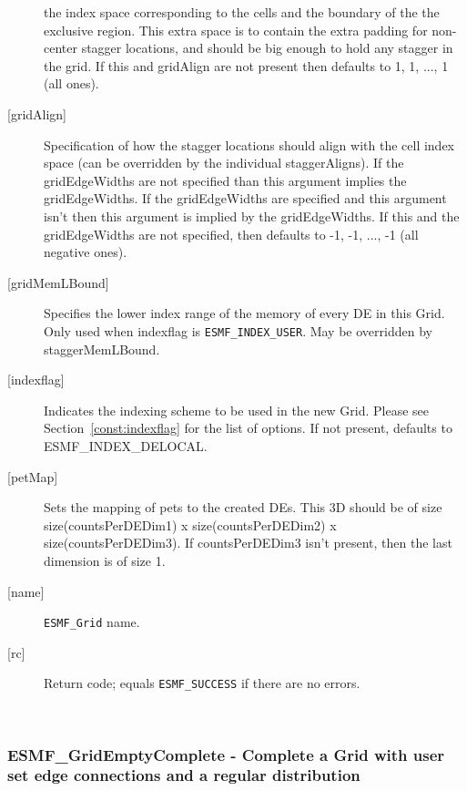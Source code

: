 \begin{description}
        the index space corresponding to the cells and the boundary of the
        the exclusive region. This extra space is to contain the extra
        padding for non-center stagger locations, and should be big enough
        to hold any stagger in the grid. If this and gridAlign are not present then
        defaults to 1, 1, ..., 1 (all ones).
   \item[{[gridAlign]}]
       Specification of how the stagger locations should align with the cell
       index space (can be overridden by the individual staggerAligns). If
       the gridEdgeWidths are not specified than this argument
       implies the gridEdgeWidths. If the gridEdgeWidths are specified and this argument isn't
       then this argument is implied by the gridEdgeWidths.
       If this and the gridEdgeWidths are not specified, then defaults to
      -1, -1, ..., -1 (all negative ones).
   \item[{[gridMemLBound]}]
        Specifies the lower index range of the memory of every DE in this Grid.
        Only used when indexflag is {\tt ESMF\_INDEX\_USER}. May be overridden
        by staggerMemLBound.
   \item[{[indexflag]}]
        Indicates the indexing scheme to be used in the new Grid. Please see
        Section~\ref{const:indexflag} for the list of options. If not present,
        defaults to ESMF\_INDEX\_DELOCAL.
   \item[{[petMap]}]
         \begin{sloppypar}
         Sets the mapping of pets to the created DEs. This 3D
         should be of size size(countsPerDEDim1) x size(countsPerDEDim2) x
         size(countsPerDEDim3). If countsPerDEDim3 isn't present, then
         the last dimension is of size 1.
         \end{sloppypar}
   \item[{[name]}]
            {\tt ESMF\_Grid} name.
   \item[{[rc]}]
        Return code; equals {\tt ESMF\_SUCCESS} if there are no errors.
   \end{description}
   
 
\mbox{}\hrulefill\ 
 
\subsubsection [ESMF\_GridEmptyComplete] {ESMF\_GridEmptyComplete - Complete a Grid with user set edge connections and a regular distribution}


